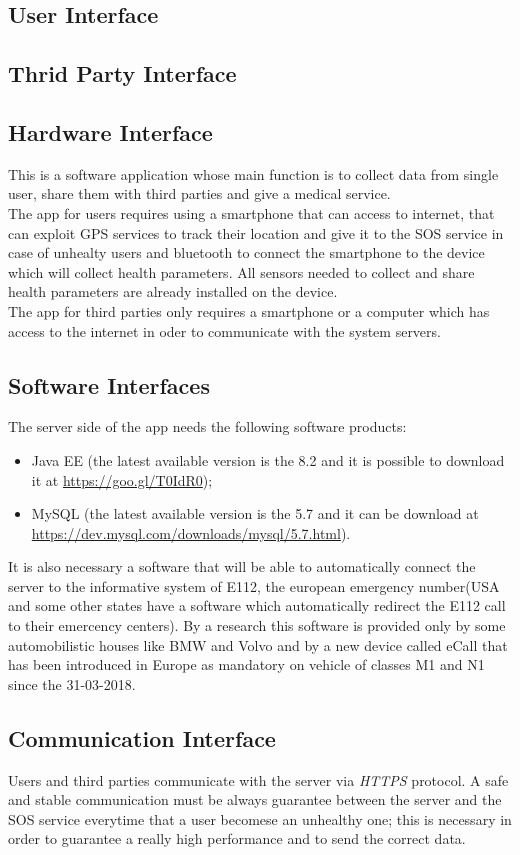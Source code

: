 \subsection{User Interface}


\subsection{Thrid Party Interface}


\subsection{Hardware Interface}
This is a software application whose main function is to collect data from single user, share them with third parties and give a medical service.\\
The app for users requires using a smartphone that can access to internet, that can exploit GPS services to track their location and give it to the SOS service in case of unhealty users and bluetooth to connect the smartphone to the device which will collect health parameters.
All sensors needed to collect and share health parameters are already installed on the device.\\
The app for third parties only requires a smartphone or a computer which has access to the internet in oder to communicate with the system servers.


\subsection{Software Interfaces}
The server side of the app needs the following software products:
\begin{itemize}
	\item Java EE (the latest available version  is the 8.2 and it is possible to download it at \url{https://goo.gl/T0IdR0});
	\item MySQL (the latest available version is the 5.7 and it can be download at \url{
	https://dev.mysql.com/downloads/mysql/5.7.html}).
\end{itemize}It is also necessary a software that will be able to automatically connect the server to the informative system of E112, the european emergency number(USA and some other states have a software which automatically redirect the E112 call to their emercency centers). By a research this software is provided only by some automobilistic houses like BMW and Volvo and by a new device called eCall that has been introduced in Europe as mandatory on vehicle of classes M1 and N1 since the 31-03-2018.


\subsection{Communication Interface}
Users and third parties communicate with the server via \textit{HTTPS} protocol.
A safe and stable communication must be always guarantee between the server and the SOS service everytime that a user becomese an unhealthy one; this is necessary in order to guarantee a really high performance and to send the correct data.
